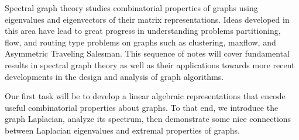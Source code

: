Spectral graph theory studies combinatorial properties of graphs using eigenvalues and eigenvectors of their matrix representations. Ideas developed in this area have lead to great progress in understanding problems partitioning, flow, and routing type problems on graphs such as clustering, maxflow, and Asymmetric Traveling Salesman. This sequence of notes will cover fundamental results in spectral graph theory as well as their applications towards more recent developments in the design and analysis of graph algorithms. 

Our first task will be to develop a linear algebraic representations that encode useful combinatorial properties about graphs. To that end, we introduce the graph Laplacian, analyze its spectrum, then demonstrate some nice connections between Laplacian eigenvalues and extremal properties of graphs.
